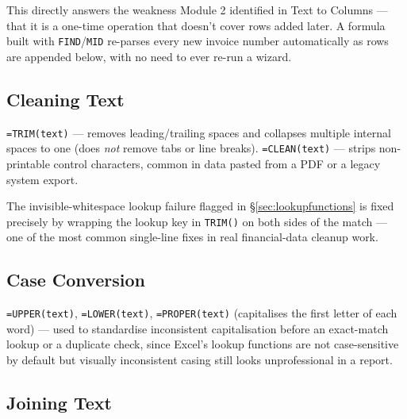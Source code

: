 \documentclass[11pt,a4paper]{article}
\begin{document}
\begin{financeapp}
This directly answers the weakness Module 2 identified in Text to Columns --- that it is a one-time operation that doesn't cover rows added later. A formula built with \texttt{FIND}/\texttt{MID} re-parses every new invoice number automatically as rows are appended below, with no need to ever re-run a wizard.
\end{financeapp}

\subsection{Cleaning Text}

\begin{formulasyntax}
\texttt{=TRIM(text)} --- removes leading/trailing spaces and collapses multiple internal spaces to one (does \emph{not} remove tabs or line breaks). \texttt{=CLEAN(text)} --- strips non-printable control characters, common in data pasted from a PDF or a legacy system export.
\end{formulasyntax}

\begin{pitfall}
The invisible-whitespace lookup failure flagged in \S\ref{sec:lookupfunctions} is fixed precisely by wrapping the lookup key in \texttt{TRIM()} on both sides of the match --- one of the most common single-line fixes in real financial-data cleanup work.
\end{pitfall}

\subsection{Case Conversion}

\texttt{=UPPER(text)}, \texttt{=LOWER(text)}, \texttt{=PROPER(text)} (capitalises the first letter of each word) --- used to standardise inconsistent capitalisation before an exact-match lookup or a duplicate check, since Excel's lookup functions are not case-sensitive by default but visually inconsistent casing still looks unprofessional in a report.

\subsection{Joining Text}
\end{document}

